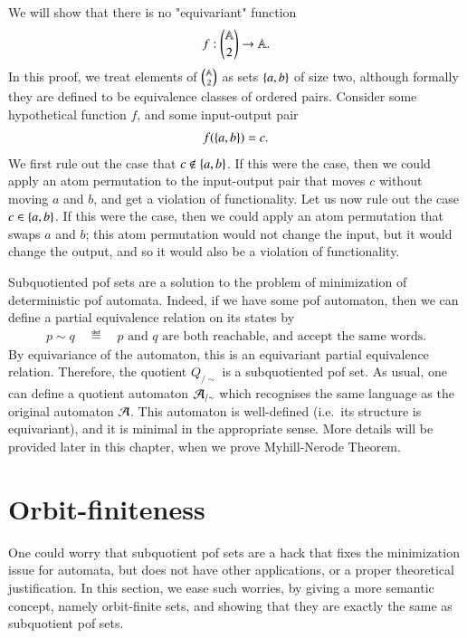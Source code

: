 \begin{myexample}\label{ex:choice-spof}
    We will show that there is no "equivariant" function 
    \begin{align*}
    f : {\mathbb A \choose 2} \to \mathbb A.
    \end{align*}
    In this proof, we treat elements of $\mathbb A \choose 2$ as sets $\{a,b\}$ of size two, although formally they are defined to be equivalence classes of ordered pairs.  Consider some hypothetical function $f$, and some  input-output pair 
    \begin{align*}
        f(\{a,b\})=c.
    \end{align*}
    We first rule out the case that $c \not \in \{a,b\}$. If this were the case, then  we could apply an  atom permutation to the input-output pair that moves $c$ without moving $a$ and $b$, and get a violation of functionality. Let us now rule out the case $c \in \{a,b\}$. If this were the case, then we could apply an atom permutation that swaps $a$ and $b$; this atom permutation would not change the input, but it would change the output, and so it would also be a violation of functionality. 
\end{myexample}




Subquotiented pof sets are a solution to the problem of minimization of deterministic pof automata. Indeed, if we have some pof automaton, then we can define a partial equivalence relation on its states by 
\begin{align*}
p \sim q \quad \eqdef \quad  \text{$p$ and $q$ are both reachable, and accept the same words}.
\end{align*}
By equivariance of the automaton, this is an equivariant partial equivalence relation. Therefore, the quotient $Q_{/\sim}$ is a subquotiented pof set. As usual, one can define a quotient automaton ${\mathcal A}_{/\sim}$ which recognises the same language as the original automaton ${\mathcal A}$. This automaton is well-defined (i.e.~its structure is equivariant), and it is minimal in the appropriate sense. More details will be provided later in this chapter, when we prove  Myhill-Nerode Theorem. 

\exercisepart

\section{Orbit-finiteness}
\label{sec:orbit-finiteness-equality}
One could worry that subquotient pof sets are a hack that fixes the minimization issue for automata, but does not have other applications, or a proper theoretical justification. In this section, we ease such worries, by giving a more semantic concept, namely orbit-finite sets, and showing that they are exactly the same as subquotient pof sets.

